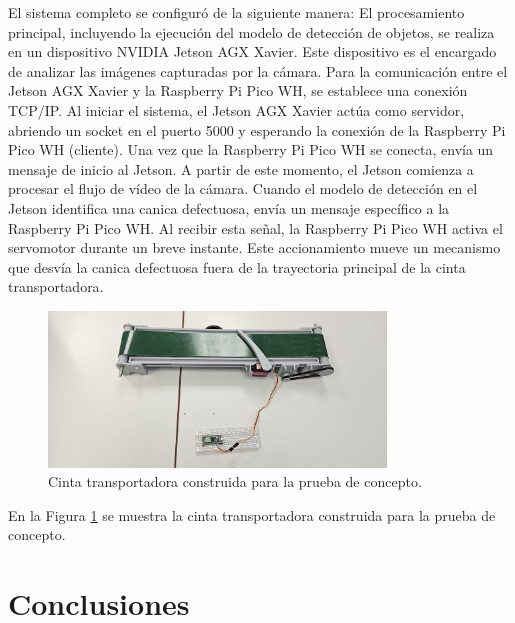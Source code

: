 \documentclass[11pt,spanish,listoffigures,listoftables]{tfgetsinf}
\begin{document}
El sistema completo se configuró de la siguiente manera:
El procesamiento principal, incluyendo la ejecución del modelo de detección de objetos, se realiza en un dispositivo NVIDIA Jetson AGX Xavier. Este dispositivo es el encargado de analizar las imágenes capturadas por la cámara.
Para la comunicación entre el Jetson AGX Xavier y la Raspberry Pi Pico WH, se establece una conexión TCP/IP. Al iniciar el sistema, el Jetson AGX Xavier actúa como servidor, abriendo un socket en el puerto 5000 y esperando la conexión de la Raspberry Pi Pico WH (cliente).
Una vez que la Raspberry Pi Pico WH se conecta, envía un mensaje de inicio al Jetson. A partir de este momento, el Jetson comienza a procesar el flujo de vídeo de la cámara.
Cuando el modelo de detección en el Jetson identifica una canica defectuosa, envía un mensaje específico a la Raspberry Pi Pico WH.
Al recibir esta señal, la Raspberry Pi Pico WH activa el servomotor durante un breve instante. Este accionamiento mueve un mecanismo que desvía la canica defectuosa fuera de la trayectoria principal de la cinta transportadora.

\begin{figure}[H]
   \centering
   \includegraphics[width=0.8\textwidth]{images/prueba_de_concepto/cinta_transportadora_construccion.jpeg}
   \caption[Cinta transportadora construida para la prueba de concepto]{Cinta transportadora construida para la prueba de concepto.}
   \label{fig:cinta_transportadora}
\end{figure}

En la Figura \ref{fig:cinta_transportadora} se muestra la cinta transportadora construida para la prueba de concepto. 






\chapter{Conclusiones} \label{chap:conclusiones}
\end{document}
